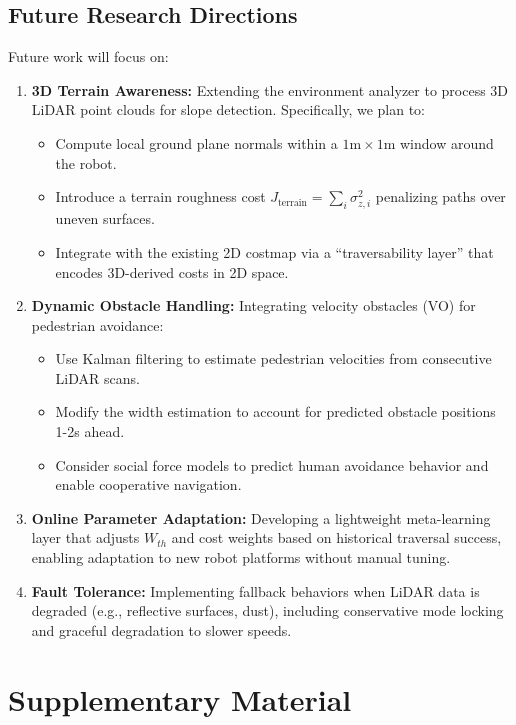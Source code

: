 \documentclass[lettersize,journal]{IEEEtran}
\begin{document}
\subsection{Future Research Directions}
Future work will focus on:
\begin{enumerate}
\item \textbf{3D Terrain Awareness:} Extending the environment analyzer to process 3D LiDAR point clouds for slope detection. Specifically, we plan to:
    \begin{itemize}
    \item Compute local ground plane normals within a $1\text{m} \times 1\text{m}$ window around the robot.
    \item Introduce a terrain roughness cost $J_{\text{terrain}} = \sum_i \sigma^2_{z,i}$ penalizing paths over uneven surfaces.
    \item Integrate with the existing 2D costmap via a ``traversability layer'' that encodes 3D-derived costs in 2D space.
    \end{itemize}

\item \textbf{Dynamic Obstacle Handling:} Integrating velocity obstacles (VO) for pedestrian avoidance:
    \begin{itemize}
    \item Use Kalman filtering to estimate pedestrian velocities from consecutive LiDAR scans.
    \item Modify the width estimation to account for predicted obstacle positions 1-2s ahead.
    \item Consider social force models to predict human avoidance behavior and enable cooperative navigation.
    \end{itemize}

\item \textbf{Online Parameter Adaptation:} Developing a lightweight meta-learning layer that adjusts $W_{th}$ and cost weights based on historical traversal success, enabling adaptation to new robot platforms without manual tuning.

\item \textbf{Fault Tolerance:} Implementing fallback behaviors when LiDAR data is degraded (e.g., reflective surfaces, dust), including conservative mode locking and graceful degradation to slower speeds.
\end{enumerate}


\appendix
\section{Supplementary Material}
\end{document}
